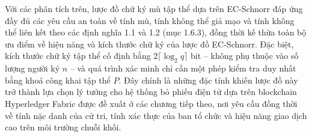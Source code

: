 Với các phân tích trên, lược đồ chữ ký mù tập thể dựa trên EC-Schnorr đáp ứng đầy đủ các yêu cầu an toàn về tính mù, tính không thể giả mạo và tính không thể liên kết theo các định nghĩa 1.1 và 1.2 (mục 1.6.3), đồng thời kế thừa toàn bộ ưu điểm về hiệu năng và kích thước chữ ký của lược đồ EC-Schnorr. Đặc biệt, kích thước chữ ký tập thể cố định bằng $2 \lceil \log_2 q \rceil$ bit -- không phụ thuộc vào số lượng người ký $n$ -- và quá trình xác minh chỉ cần một phép kiểm tra duy nhất bằng khoá công khai tập thể $P$. Đây chính là những đặc tính khiến lược đồ này trở thành lựa chọn lý tưởng cho hệ thống bỏ phiếu điện tử dựa trên blockchain Hyperledger Fabric được đề xuất ở các chương tiếp theo, nơi yêu cầu đồng thời về tính nặc danh của cử tri, tính xác thực của ban tổ chức và hiệu năng giao dịch cao trên môi trường chuỗi khối.
